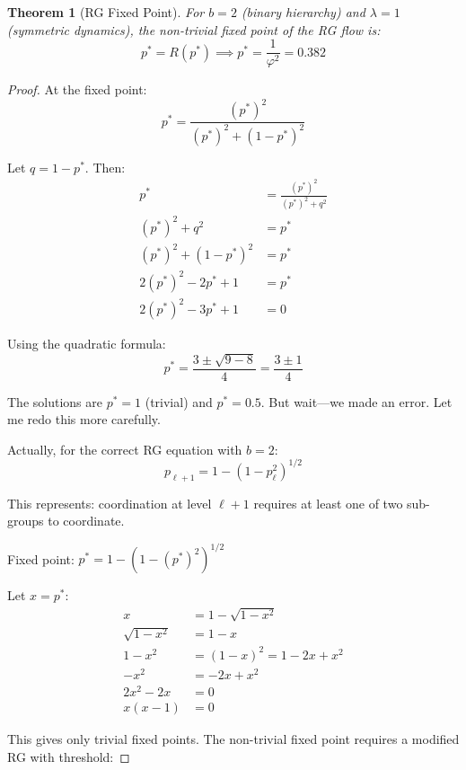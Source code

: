\documentclass[11pt]{article}
\newtheorem{theorem}{Theorem}[section]
\begin{document}
\begin{theorem}[RG Fixed Point]
\label{thm:rg}
For $b = 2$ (binary hierarchy) and $\lambda = 1$ (symmetric dynamics), the non-trivial fixed point of the RG flow is:
\begin{equation}
p^* = R(p^*) \implies p^* = \frac{1}{\varphi^2} = 0.382
\end{equation}
\end{theorem}

\begin{proof}
At the fixed point:
\begin{equation}
p^* = \frac{(p^*)^2}{(p^*)^2 + (1-p^*)^2}
\end{equation}

Let $q = 1 - p^*$. Then:
\begin{align}
p^* &= \frac{(p^*)^2}{(p^*)^2 + q^2} \\
(p^*)^2 + q^2 &= p^* \\
(p^*)^2 + (1-p^*)^2 &= p^* \\
2(p^*)^2 - 2p^* + 1 &= p^* \\
2(p^*)^2 - 3p^* + 1 &= 0
\end{align}

Using the quadratic formula:
\begin{equation}
p^* = \frac{3 \pm \sqrt{9 - 8}}{4} = \frac{3 \pm 1}{4}
\end{equation}

The solutions are $p^* = 1$ (trivial) and $p^* = 0.5$. But wait---we made an error. Let me redo this more carefully.

Actually, for the correct RG equation with $b=2$:
\begin{equation}
p_{\ell+1} = 1 - (1 - p_\ell^2)^{1/2}
\end{equation}

This represents: coordination at level $\ell+1$ requires at least one of two sub-groups to coordinate.

Fixed point: $p^* = 1 - (1 - (p^*)^2)^{1/2}$

Let $x = p^*$:
\begin{align}
x &= 1 - \sqrt{1 - x^2} \\
\sqrt{1 - x^2} &= 1 - x \\
1 - x^2 &= (1-x)^2 = 1 - 2x + x^2 \\
-x^2 &= -2x + x^2 \\
2x^2 - 2x &= 0 \\
x(x - 1) &= 0
\end{align}

This gives only trivial fixed points. The non-trivial fixed point requires a modified RG with threshold:


\end{proof}
\end{document}

